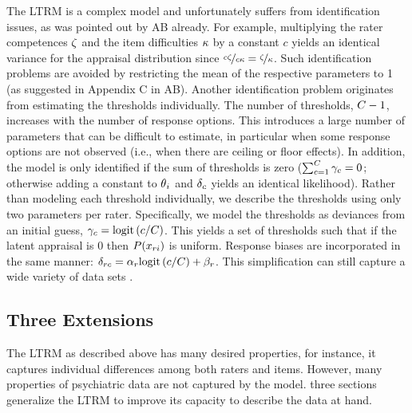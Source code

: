 \documentclass[a4paper]{article}
\newcommand{\AB}{AB}
\begin{document}
The LTRM is a complex model and unfortunately suffers from identification issues, as was pointed out by \AB{} already. For example, multiplying the rater competences $\zeta$ and the item difficulties $\kappa$ by a constant $c$ yields an identical variance for the appraisal distribution since $\nicefrac{c\zeta}{c\kappa} = \nicefrac{\zeta}{\kappa}$. Such identification problems are avoided by restricting the mean of the respective parameters to 1 (as suggested in Appendix C in \AB{}).
Another identification problem originates from estimating the thresholds individually. The number of thresholds, $\Tncat-1$, increases with the number of response options. This introduces a large number of parameters that can be difficult to estimate, in particular when some response options are not observed (i.e., when there are ceiling or floor effects). In addition, the model is only identified if the sum of thresholds is zero ($\sum_{\Incat=1}^{\Tncat}\UnBiasedThreshold_\Incat = 0$; otherwise adding a constant to $\theta{}_i$ and $\delta_c$ yields an identical likelihood). Rather than modeling each threshold individually, we describe the thresholds using only two parameters per rater. Specifically, we model the thresholds as deviances from an initial guess, $\gamma_c = \text{logit}\left(c/C\right)$. This yields a set of thresholds such that if the latent appraisal is 0 then $P(x_{ri})$ is uniform. Response biases are incorporated in the same manner: $\delta_{rc} = \alpha_r\text{logit}\left(c/C\right) + \beta_r$. This simplification can still capture a wide variety of data sets \cite{Selker2019}. 

\subsection*{Three Extensions}

The LTRM as described above has many desired properties, for instance, it captures individual differences among both raters and items. However, many properties of psychiatric data are not captured by the model. three sections generalize the LTRM to improve its capacity to describe the data at hand.
\end{document}
